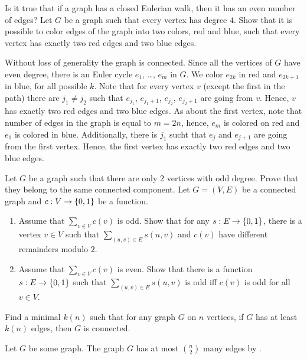 \begin{chapterendexercises}
  \exercise Is it true that if a graph has a closed Eulerian walk, then it has
    an even number of edges?
  \exercise Let $G$ be a graph such that every vertex has degree $4$. Show that
    it is possible to color edges of the graph into two colors, red and blue,
    such that every vertex has exactly two red edges and two blue edges.
    \begin{solution}
      Without loss of generality the graph is connected. Since all the vertices
      of $G$ have even degree, there is an Euler cycle $e_1$, \dots, $e_m$ in
      $G$. We color $e_{2k}$ in red and $e_{2k + 1}$ in blue, for all possible
      $k$. Note that for every vertex $v$ (except the first in the path) there
      are $j_1 \neq j_2$ such that $e_{j_1}$, $e_{j_1 + 1}$, $e_{j_2}$, $e_{j_2
      + 1}$ are going from $v$. Hence, $v$ has exactly two red edges and two
      blue edges. As about the first vertex, note that number of edges in the
      graph is equal to $m = 2n$, hence, $e_m$ is colored on red and $e_1$ is
      colored in blue. Additionally, there is $j_1$ sucht that $e_{j}$ and $e_{j
      + 1}$ are going from the first vertex. Hence, the first vertex has exactly
      two red edges and two blue edges.
    \end{solution}
  \exercise[recommended] Let $G$ be a graph such that there are only $2$
    vertices with odd degree. Prove that they belong to the same connected
    component.
  \exercise Let $G = (V, E)$ be a connected graph and $c : V \to \set{0, 1}$
    be a function.
    \begin{enumerate}
      \item Assume that $\sum_{v \in V} c(v)$ is odd.
        Show that for any $s : E \to \set{0, 1}$, there is a vertex
        $v \in V$ such that $\sum_{(u, v) \in E} s(u, v)$ and $c(v)$
        have different remainders modulo $2$.
      \item Assume that $\sum_{v \in V} c(v)$ is even.
        Show that there is a function $s : E \to \set{0, 1}$
        such that $\sum_{(u, v) \in E} s(u, v)$ is odd iff $c(v)$ is odd
        for all $v \in V$.
    \end{enumerate}
  \exercise Find a minimal $k(n)$ such that for any graph $G$ on $n$ vertices,
    if $G$ has at least $k(n)$ edges, then $G$ is connected.
    \begin{solution}
      Let $G$ be some graph. The graph $G$ has at most $\binom{n}{2}$ many edges
      by .


\end{solution}
\end{chapterendexercises}
